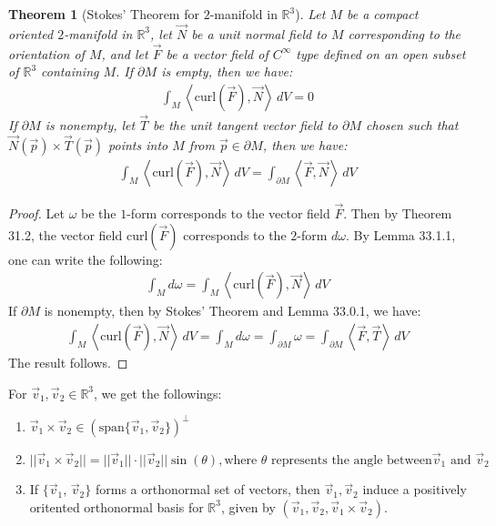 \documentclass[15pt]{book}
\theoremstyle{break}
\theoremstyle{break}
\newtheorem{thm}{Theorem}[section]
\newcommand{\R}{\mathbb{R}}
\newcommand{\spa}{\text{span}}
\begin{document}
\begin{thm}[Stokes' Theorem for $2$-manifold in $\R^3$]
Let $M$ be a compact oriented $2$-manifold in $\R^3$, let $\vec{N}$ be a unit normal field to $M$ corresponding to the orientation of $M$, and let $\vec{F}$ be a vector field of $C^\infty$ type defined on an open subset of $\R^3$ containing $M$. If $\partial M$ is empty, then we have:
\begin{align*}
\int_M \left< \text{curl}(\vec{F}),\vec{N}\right> \, dV = 0
\end{align*}
If $\partial M$ is nonempty, let $\vec{T}$ be the unit tangent vector field to $\partial M$ chosen such that $\vec{N}(\vec{p}) \times \vec{T}(\vec{p})$ points into $M$ from $\vec{p}\in \partial M$, then we have:
\begin{align*}
\int_M \left< \text{curl}(\vec{F}),\vec{N}\right> \, dV = \int_{\partial M}\left< \vec{F},\vec{N}\right>\, dV
\end{align*}
\end{thm}
\begin{proof}
Let $\omega$ be the $1$-form corresponds to the vector field $\vec{F}$. Then by Theorem 31.2, the vector field $\text{curl}(\vec{F})$ corresponds to the $2$-form $d\omega$. By Lemma 33.1.1, one can write the following:
\begin{align*}
\int_M d\omega = \int_M \left< \text{curl}(\vec{F}),\vec{N}\right>\, dV
\end{align*}
If $\partial M$ is nonempty, then by Stokes' Theorem and Lemma 33.0.1, we have:
\begin{align*}
\int_M \left< \text{curl}(\vec{F}),\vec{N}\right>\, dV = \int_{M}d\omega=\int_{\partial M}\omega = \int_{\partial M}\left< \vec{F},\vec{T}\right> \, dV
\end{align*}
The result follows.
\end{proof}


For $\vec{v}_1,\vec{v}_2 \in \R^3$, we get the followings:
\begin{enumerate}[topsep=3pt,itemsep=-1ex,partopsep=1ex,parsep=1ex]
\item $\vec{v}_1\times \vec{v}_2 \in (\spa\{ \vec{v}_1,\vec{v}_2\})^\perp$
\item $||\vec{v}_1\times \vec{v}_2|| = ||\vec{v}_1|| \cdot ||\vec{v}_2|| \sin(\theta), \text{where }\theta\text{ represents the angle between} \vec{v}_1\text{ and }\vec{v}_2$
\item If $\{\vec{v}_1$, $\vec{v}_2\}$ forms a orthonormal set of vectors, then $\vec{v}_1,\vec{v}_2$ induce a positively oritented orthonormal basis for $\R^3$, given by $(\vec{v}_1,\vec{v}_2, \vec{v}_1\times \vec{v}_2)$.
\end{enumerate}
\end{document}
